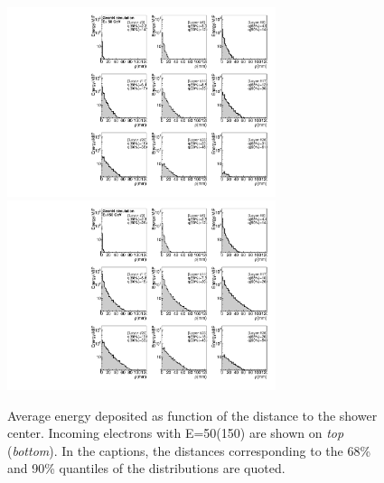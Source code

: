 \begin{figure}[h!]
  \begin{center}
    \includegraphics[width=0.7\textwidth]{figures/csensorenhitsvsrE50}
    \includegraphics[width=0.7\textwidth]{figures/csensorenhitsvsrE150}
    \caption{Average energy deposited as function of the distance to
      the shower center.  Incoming electrons
      with E=50\GeV (150\GeV) are shown on {\em top} ({\em bottom}).
     In the captions, the distances corresponding to the 68\% and 90\%
    quantiles of the distributions are quoted.
   }
    \label{fig:showertransavgen}
  \end{center}
\end{figure}

